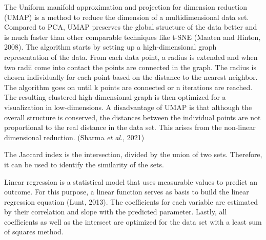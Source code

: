 \documentclass[
  parskip,
  oneside]{scrreprt}
\begin{document}
The Uniform manifold approximation and projection for dimension
reduction (UMAP) is a method to reduce the dimension of a
multidimensional data set. Compared to PCA, UMAP preserves the global
structure of the data better and is much faster than other comparable
techniques like t-SNE (Maaten and Hinton, 2008). The algorithm starts by
setting up a high-dimensional graph representation of the data. From
each data point, a radius is extended and when two radii come into
contact the points are connected in the graph. The radius is chosen
individually for each point based on the distance to the nearest
neighbor. The algorithm goes on until k points are connected or n
iterations are reached. The resulting clustered high-dimensional graph
is then optimized for a visualization in low-dimensions. A disadvantage
of UMAP is that although the overall structure is conserved, the
distances between the individual points are not proportional to the real
distance in the data set. This arises from the non-linear dimensional
reduction. (Sharma \emph{et al.}, 2021)

The Jaccard index is the intersection, divided by the union of two sets.
Therefore, it can be used to identify the similarity of the sets.

Linear regression is a statistical model that uses measurable values to
predict an outcome. For this purpose, a linear function serves as basis
to build the linear regression equation (Lunt, 2013). The coefficients
for each variable are estimated by their correlation and slope with the
predicted parameter. Lastly, all coefficients as well as the intersect
are optimized for the data set with a least sum of squares method.
\end{document}
